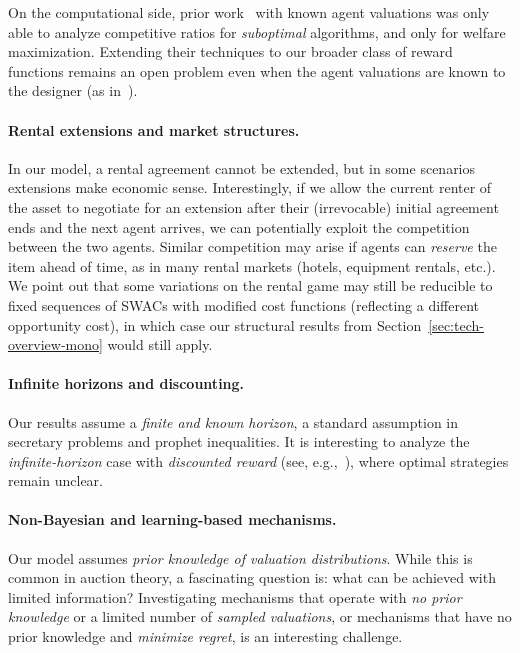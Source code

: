 \documentclass[11pt,letterpaper]{article}
\newcommand{\swacs}{SWACs\xspace}
\theoremstyle{plain}
\begin{document}
On the computational side, prior work~\cite{AbelsPS23} 
with known agent valuations
was only able to analyze competitive ratios for \emph{suboptimal} algorithms, and only for welfare maximization. Extending their techniques to our broader class of reward functions remains an open problem even when the agent valuations are {known} to the designer (as in~\cite{AbelsPS23}).

\paragraph{Rental extensions and market structures.}  
In our model, a rental agreement cannot be extended, but in some scenarios extensions make economic sense. Interestingly, if we allow the current renter of the asset to negotiate for an extension after their (irrevocable) initial agreement ends and the next agent arrives,
we can potentially exploit the competition between the two agents. Similar competition may arise if agents can \emph{reserve} the item ahead of time, as in many rental markets (hotels, equipment rentals, etc.).
We point out that some variations on the rental game may still be reducible to fixed sequences of 
\swacs
with modified cost functions (reflecting a different opportunity cost), in which case our structural results from Section~\ref{sec:tech-overview-mono} would still apply.


\paragraph{Infinite horizons and discounting.}  
Our results assume a \emph{finite and known horizon}, a standard assumption in {secretary problems} and {prophet inequalities}.
It is interesting to analyze the \emph{infinite-horizon} case with \emph{discounted reward} (see, e.g.,~\cite{BalseiroML17}), where optimal strategies remain unclear.

\paragraph{Non-Bayesian and learning-based mechanisms.}  
Our model assumes \emph{prior knowledge of valuation distributions}. While this is common in auction theory, a fascinating question is: what can be achieved with limited information? Investigating mechanisms that operate with \emph{no prior knowledge} or a limited number of \emph{sampled valuations},
or mechanisms that
have no prior knowledge and
\emph{minimize regret},
is an interesting challenge.
\end{document}
